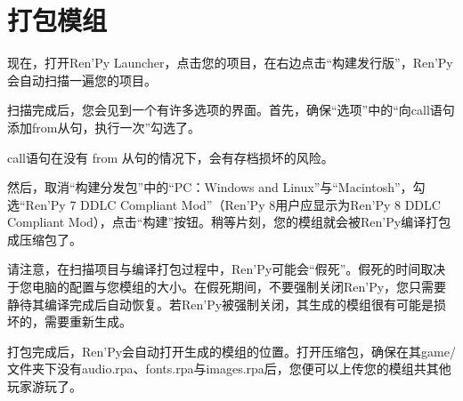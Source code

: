\documentclass[../../Main.tex]{subfiles}
\begin{document}
\section{打包模组}
现在，打开Ren'Py Launcher，点击您的项目，在右边点击“构建发行版”，Ren'Py 会自动扫描一遍您的项目。

扫描完成后，您会见到一个有许多选项的界面。首先，确保“选项”中的“向call语句添加from从句，执行一次”勾选了。
\begin{Warning}
    call语句在没有 from 从句的情况下，会有存档损坏的风险。
\end{Warning}
然后，取消“构建分发包”中的“PC：Windows and Linux”与“Macintosh”，勾选“Ren'Py 7 DDLC Compliant Mod”（Ren'Py 8用户应显示为Ren'Py 8 DDLC Compliant Mod），点击“构建”按钮。稍等片刻，您的模组就会被Ren'Py编译打包成压缩包了。
\begin{Warning}
    请注意，在扫描项目与编译打包过程中，Ren'Py可能会“假死”。假死的时间取决于您电脑的配置与您模组的大小。在假死期间，不要强制关闭Ren'Py，您只需要静待其编译完成后自动恢复。若Ren'Py被强制关闭，其生成的模组很有可能是损坏的，需要重新生成。
\end{Warning}

打包完成后，Ren'Py会自动打开生成的模组的位置。打开压缩包，确保在其game/文件夹下没有audio.rpa、fonts.rpa与images.rpa后，您便可以上传您的模组共其他玩家游玩了。
\end{document}
